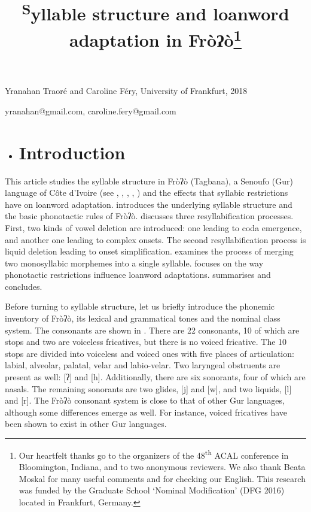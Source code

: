 
\title{\textsuperscript{S}yllable structure and loanword adaptation in Fròʔò\footnote{Our heartfelt thanks go to the organizers of the 48\textsuperscript{th} ACAL conference in Bloomington, Indiana, and to two anonymous reviewers. We also thank Beata Moskal for many useful comments and for checking our English. This research was funded by the Graduate School ‘Nominal Modification’ (DFG 2016) located in Frankfurt, Germany.}}

Yranahan Traoré and Caroline Féry, University of Frankfurt, 2018

yranahan@gmail.com, caroline.fery@gmail.com

\begin{itemize}
\item \section{ Introduction}\end{itemize}

This article studies the syllable structure in Fròʔò (Tagbana), a Senoufo (Gur) language of Côte d’Ivoire (see \citealt{Clamens1952}, \citealt{Manessy1962}, \citealt{HéraultMlanhoro1973}, \citealt{Miehe2012}, \citealt{MieheEtAl2012}) and the effects that syllabic restrictions have on loanword adaptation.  introduces the underlying syllable structure and the basic phonotactic rules of Fròʔò.  discusses three resyllabification processes. First, two kinds of vowel deletion are introduced: one leading to coda emergence, and another one leading to complex onsets.  The second resyllabification process is liquid deletion leading to onset simplification.  examines the process of merging two monosyllabic morphemes into a single syllable.  focuses on the way phonotactic restrictions influence loanword adaptations.  summarises and concludes.

Before turning to syllable structure, let us briefly introduce the phonemic inventory of Fròʔò, its lexical and grammatical tones and the nominal class system. The consonants are shown in . There are 22 consonants, 10 of which are stops and two are voiceless fricatives, but there is no voiced fricative. The 10 stops are divided into voiceless and voiced ones with five places of articulation: labial, alveolar, palatal, velar and labio-velar. Two laryngeal obstruents are present as well: [ʔ] and [h]. Additionally, there are six sonorants, four of which are nasals. The remaining sonorants are two glides, [j] and [w], and two liquids, [l] and [r]. The Fròʔò consonant system is close to that of other ​​Gur languages, although some differences emerge as well. For instance, voiced fricatives have been shown to exist in other Gur languages.

